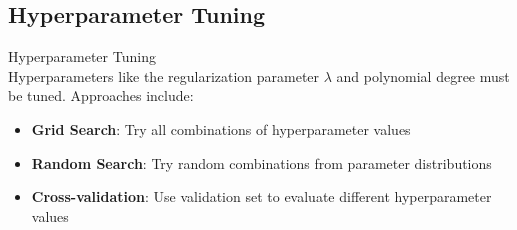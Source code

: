 \raggedcolumns
\columnbreak

\subsection{Hyperparameter Tuning}

\begin{concept}{Hyperparameter Tuning}\\
Hyperparameters like the regularization parameter $\lambda$ and polynomial degree must be tuned. Approaches include:
\begin{itemize}
    \item \textbf{Grid Search}: Try all combinations of hyperparameter values
    \item \textbf{Random Search}: Try random combinations from parameter distributions
    \item \textbf{Cross-validation}: Use validation set to evaluate different hyperparameter values
\end{itemize}
\end{concept}


